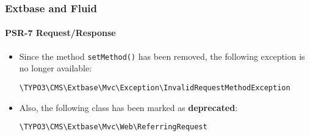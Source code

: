 %

\begin{frame}[fragile]
	\frametitle{Extbase and Fluid}
	\framesubtitle{PSR-7 Request/Response}


	\begin{itemize}
		\item Since the method \texttt{setMethod()} has been removed,
			the following exception is no longer available:
\begin{lstlisting}
\TYPO3\CMS\Extbase\Mvc\Exception\InvalidRequestMethodException
\end{lstlisting}

		\item Also, the following class has been marked as \textbf{deprecated}:
\begin{lstlisting}
\TYPO3\CMS\Extbase\Mvc\Web\ReferringRequest
\end{lstlisting}

	\end{itemize}
\end{frame}

